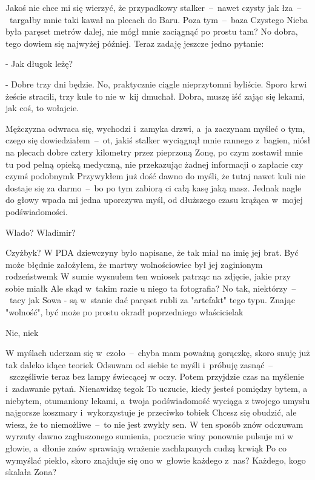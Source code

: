 \documentclass[../MAIN.tex]{subfiles}
\begin{document}
Jakoś nie chce mi się wierzyć, że przypadkowy stalker~--~nawet
czysty jak łza~--~targałby mnie taki kawał na plecach do Baru.
Poza tym~--~baza Czystego Nieba była paręset metrów dalej, nie
mógł mnie zaciągnąć po prostu tam? No dobra, tego dowiem się
najwyżej później. Teraz zadaję jeszcze jedno pytanie:

- Jak długo\3k leżę?

- Dobre trzy dni będzie. No, praktycznie ciągle nieprzytomni
byliście. Sporo krwi żeście stracili, trzy kule to nie w~kij
dmuchał. Dobra, muszę iść zając się lekami, jak coś, to
wołajcie.

Mężczyzna odwraca się, wychodzi i~zamyka drzwi, a~ja zaczynam
myśleć o tym, czego się dowiedziałem~--~ot, jakiś stalker
wyciągnął mnie rannego z~bagien, niósł na plecach dobre cztery
kilometry przez pieprzoną Zonę, po czym zostawił mnie tu pod
pełną opieką medyczną, nie przekazując żadnej informacji o
zapłacie czy czymś podobnym\3k Przywykłem już dość dawno do
myśli, że tutaj nawet kuli nie dostaje się za darmo~--~bo po
tym
zabiorą ci całą kasę jaką masz. Jednak nagle do głowy wpada mi
jedna uporczywa myśl, od dłuższego czasu krążąca w~mojej
podświadomości.

Wlado? Wladimir?

Czyżby\3k? W PDA dziewczyny było napisane, że tak miał na imię
jej brat. Być może błędnie założyłem, że martwy wolnościowiec
był jej zaginionym rodzeństwem\3k W sumie wysnułem ten wniosek
patrząc na zdjęcie, jakie przy sobie miał\3k Ale skąd w~takim
razie u niego ta fotografia? No tak, niektórzy~--~tacy jak Sowa
- są w~stanie dać paręset rubli za "artefakt" tego typu. Znając
"wolność", być może po prostu okradł poprzedniego
właściciela\3k

Nie, nie\3k

W myślach uderzam się w~czoło~--~chyba mam poważną gorączkę,
skoro snuję już tak daleko idące teorie\3k Odsuwam od siebie te
myśli i~próbuję zasnąć~--~szczęśliwie teraz bez lampy świecącej
w oczy. Potem przyjdzie czas na myślenie i~zadawanie pytań.
%
%
Nienawidzę tego\3k To uczucie, kiedy jesteś pomiędzy bytem, a
niebytem, otumaniony lekami, a~twoja podświadomość wyciąga z
twojego umysłu najgorsze koszmary i~wykorzystuje je przeciwko
tobie\3k Chcesz się obudzić, ale wiesz, że to niemożliwe~--~to
nie
jest zwykły sen. W ten sposób znów odczuwam wyrzuty dawno
zagłuszonego sumienia, poczucie winy ponownie pulsuje mi w
głowie, a~dłonie znów sprawiają wrażenie zachlapanych cudzą
krwią\3k Po co wymyślać piekło, skoro znajduje się ono w~głowie
każdego z~nas? Każdego, kogo skalała Zona?
\end{document}
